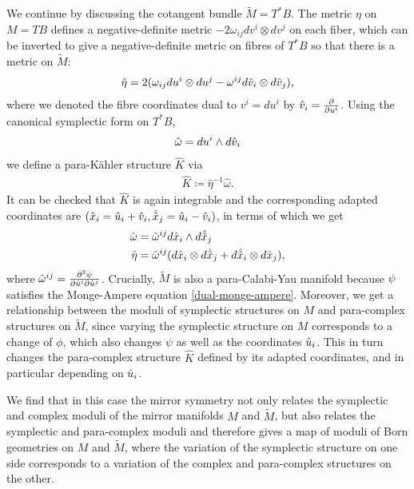 \documentclass[letterpaper,12pt]{article}
\def\w{\wedge}
\newcommand{\p}{\partial}
\newcommand{\Mt}{\tl{M}}
\def\tl{\tilde}
\theoremstyle{definition}
\theoremstyle{remark}
\theoremstyle{examples}
\begin{document}
We continue by discussing the cotangent bundle $\Mt=T^*B$. The metric $\eta$ on $M=TB$ defines a negative-definite metric $-2\omega_{ij}dv^i\otimes dv^j$ on each fiber, which can be inverted to give a negative-definite metric on fibres of $T^*B$ so that there is a metric on $\Mt$:
\begin{align*}
    \hat{\eta}=2(\omega_{ij}du^i\otimes du^j-\omega^{ij}d\hat{v}_i\otimes d\hat{v}_j),
\end{align*}
where we denoted the fibre coordinates dual to $v^i=du^i$ by $\vh_i=\frac{\p}{\p u^i}$. Using the canonical symplectic form on $T^*B$,
\begin{align*}
    \hat{\omega}=du^i\w d\vh_i
\end{align*}
we define a para-K\"ahler structure $\hat{K}$ via
\begin{align*}
    \hat{K}\coloneqq \hat{\eta}^{-1}\hat{\omega}.
\end{align*}
It can be checked that $\hat{K}$ is again integrable and the corresponding adapted coordinates are $(\hat{x}_i=\hat{u}_i+\hat{v}_i,\hat{{\tilde{x}}}_j=\hat{u}_i-\hat{v}_i)$, in terms of which we get
\begin{align*}
    \hat{\omega}&=\hat{\omega}^{ij}d\xh_i\w d\xth_j\\
    \hat{\eta}&=\hat{\omega}^{ij}(d\xh_i\otimes d\xth_j + d\xth_i\otimes d\xh_j),
\end{align*}
where $\hat{\omega}^{ij}=\frac{\p^2 \psi}{\p \uh^i\p \uh^j}$. Crucially, $\Mt$ is also a para-Calabi-Yau manifold because $\psi$ satisfies the Monge-Ampere equation \eqref{dual-monge-ampere}. Moreover, we get a relationship between the moduli of symplectic structures on $M$ and para-complex structures on $\Mt$, since varying the symplectic structure on $M$ corresponds to a change of $\phi$, which also changes $\psi$ as well as the coordinates $\hat{u}_i$. This in turn changes the para-complex structure $\hat{K}$ defined by its adapted coordinates, and in particular depending on $\hat{u}_i$.

We find that in this case the mirror symmetry not only relates the symplectic and complex moduli of the mirror manifolds $M$ and $\Mt$, but also relates the symplectic and para-complex moduli and therefore gives a map of moduli of Born geometries on $M$ and $\Mt$, where the variation of the symplectic structure on one side corresponds to a variation of the complex and para-complex structures on the other.
\end{document}
